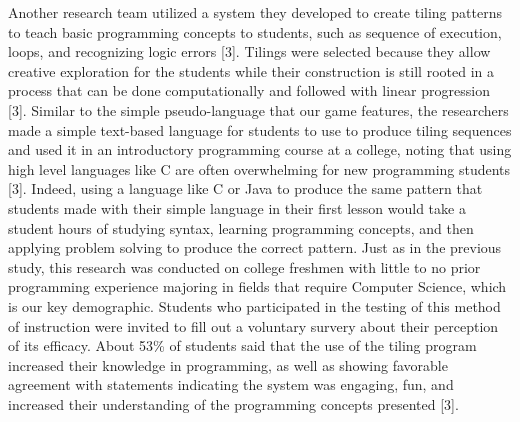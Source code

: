 Another research team utilized a system they developed to create tiling patterns to teach 
basic programming concepts to students, such as sequence of execution, loops, and 
recognizing logic errors [3]. Tilings were selected because they allow creative 
exploration for the students while their construction is still rooted in a process that can 
be done computationally and followed with linear progression [3]. Similar to the simple 
pseudo-language that our game features, the researchers made a simple text-based 
language for students to use to produce tiling sequences and used it in an introductory 
programming course at a college, noting that using high level languages like C are often
overwhelming for new programming students [3]. Indeed, using a language like C or 
Java to produce the same pattern that students made with their simple language in their 
first lesson would take a student hours of studying syntax, learning programming 
concepts, and then applying problem solving to produce the correct pattern. Just as in 
the previous study, this research was conducted on college freshmen with little to no 
prior programming experience majoring in fields that require Computer Science, which is our 
key demographic. Students who participated in the testing of this method of instruction 
were invited to fill out a voluntary survery about their perception of its efficacy. About 
53\% of students said that the use of the tiling program increased their knowledge in 
programming, as well as showing favorable agreement with statements indicating the 
system was engaging, fun, and increased their understanding of the programming 
concepts presented [3].\\

